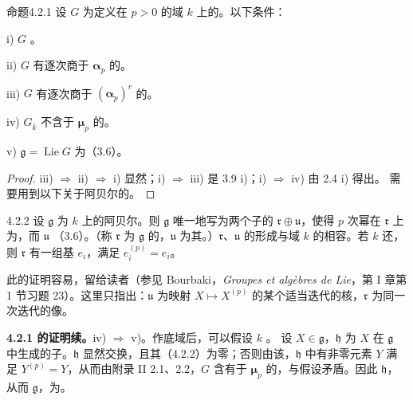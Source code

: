 \begin{SGAresult}{命题}{4.2.1}
设 $G$ 为定义在 $p>0$ 的域 $k$ 上的。以下条件：

i) $G$ 。

ii) $G$ 有逐次商于 $\boldsymbol\alpha_p$ 的。

iii) $G$ 有逐次商于 $(\boldsymbol\alpha_p)^r$ 的。

iv) $G_{\overline k}$ 不含于 $\boldsymbol\mu_p$ 的。

v) $\mathfrak g=\operatorname{Lie}G$ 为（3.6）。
\end{SGAresult}
\begin{proof}
iii) $\Rightarrow$ ii) $\Rightarrow$ i) 显然；i) $\Rightarrow$ iii) 是 3.9 i)；i) $\Rightarrow$ iv) 由 2.4 i) 得出。
需要用到以下关于阿贝尔的。
\end{proof}
\begin{SGAresult}{}{4.2.2}
设 $\mathfrak g$ 为 $k$ 上的阿贝尔。则 $\mathfrak g$ 唯一地写为两个子的 $\mathfrak r\oplus\mathfrak u$，使得 $p$ 次幂在 $\mathfrak r$ 上为，而 $\mathfrak u$ （3.6）。（称 $\mathfrak r$ 为 $\mathfrak g$ 的，$\mathfrak u$ 为其。）$\mathfrak r$、$\mathfrak u$ 的形成与域 $k$ 的相容。若 $k$ 还，则 $\mathfrak r$ 有一组基 $e_i$，满足 $e_i^{(p)}=e_i$。
\end{SGAresult}
此的证明容易，留给读者（参见 Bourbaki，\textit{Groupes et algèbres de Lie}，第 I 章第 1 节习题 23）。这里只指出：$\mathfrak u$ 为映射 $X\mapsto X^{(p)}$ 的某个适当迭代的核，$\mathfrak r$ 为同一次迭代的像。

\textbf{4.2.1 的证明续。}iv) $\Rightarrow$ v)。作底域后，可以假设 $k$ 。
设 $X\in\mathfrak g$，$\mathfrak h$ 为 $X$ 在 $\mathfrak g$ 中生成的子。$\mathfrak h$ 显然交换，且其（4.2.2）为零；否则由该，$\mathfrak h$ 中有非零元素 $Y$ 满足 $Y^{(p)}=Y$，从而由附录 II 2.1、2.2，$G$ 含有于 $\boldsymbol\mu_p$ 的，与假设矛盾。因此 $\mathfrak h$，从而 $\mathfrak g$，为。

